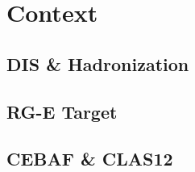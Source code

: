 \section{Context}
\begin{frame}{}
    \centering \Huge{}
\end{frame}

\subsection{DIS \& Hadronization}


\subsection{RG-E Target}


\subsection{CEBAF \& CLAS12}

